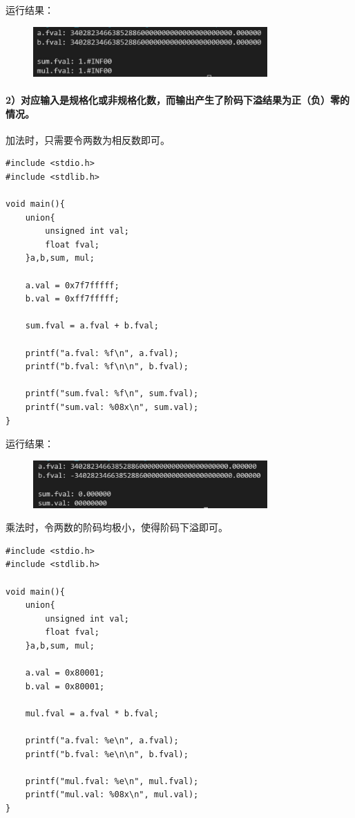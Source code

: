 \documentclass[UTF8]{ctexart}
\begin{document}
运行结果：
\begin{figure}[H]
    \centering
    \includegraphics[width=0.8\textwidth]{assets/1.jpg}
\end{figure}

\paragraph{2）对应输入是规格化或非规格化数，而输出产生了阶码下溢结果为正（负）零的情况。}
加法时，只需要令两数为相反数即可。
\begin{lstlisting}[style=CStyle]
#include <stdio.h>
#include <stdlib.h>

void main(){
    union{
        unsigned int val;
        float fval;
    }a,b,sum, mul;

    a.val = 0x7f7fffff;
    b.val = 0xff7fffff;

    sum.fval = a.fval + b.fval;

    printf("a.fval: %f\n", a.fval);
    printf("b.fval: %f\n\n", b.fval);

    printf("sum.fval: %f\n", sum.fval);
    printf("sum.val: %08x\n", sum.val);
}
\end{lstlisting}

运行结果：
\begin{figure}[H]
    \centering
    \includegraphics[width=0.8\textwidth]{assets/2.jpg}
\end{figure}

乘法时，令两数的阶码均极小，使得阶码下溢即可。
\begin{lstlisting}[style=CStyle]
#include <stdio.h>
#include <stdlib.h>

void main(){
    union{
        unsigned int val;
        float fval;
    }a,b,sum, mul;

    a.val = 0x80001;
    b.val = 0x80001;

    mul.fval = a.fval * b.fval;

    printf("a.fval: %e\n", a.fval);
    printf("b.fval: %e\n\n", b.fval);

    printf("mul.fval: %e\n", mul.fval);
    printf("mul.val: %08x\n", mul.val);
}
\end{lstlisting}
\end{document}
